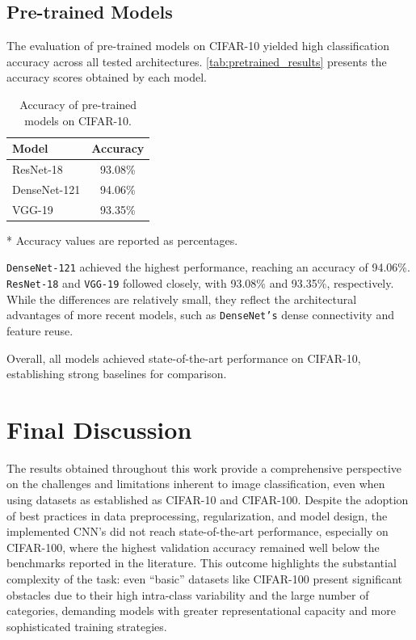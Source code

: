 \documentclass[journal,article,submit,pdftex,moreauthors]{Definitions/mdpi}
\begin{document}
\clearpage

\subsection{Pre-trained Models}
\label{sec:pretrained_models_results}

The evaluation of pre-trained models on CIFAR-10 yielded high classification accuracy across all tested architectures. \autoref{tab:pretrained_results} presents the accuracy scores obtained by each model.


\begin{table}[H]
\caption{Accuracy of pre-trained models on CIFAR-10.\label{tab:pretrained_results}}
\centering
\begin{tabular}{lc}
\toprule
\textbf{Model} & \textbf{Accuracy} \\
\midrule
ResNet-18     & 93.08\% \\
DenseNet-121  & 94.06\% \\
VGG-19        & 93.35\% \\
\bottomrule
\end{tabular}
\vspace{0.5em}

\noindent\footnotesize{* Accuracy values are reported as percentages.}
\end{table}

\texttt{DenseNet-121} achieved the highest performance, reaching an accuracy of 94.06\%. \texttt{ResNet-18} and \texttt{VGG-19} followed closely, with 93.08\% and 93.35\%, respectively. While the differences are relatively small, they reflect the architectural advantages of more recent models, such as \texttt{DenseNet’s} dense connectivity and feature reuse.

Overall, all models achieved state-of-the-art performance on CIFAR-10, establishing strong baselines for comparison.

\section{Final Discussion}
\label{sec:final_discussion}

The results obtained throughout this work provide a comprehensive perspective on the challenges and limitations inherent to image classification, even when using datasets as established as CIFAR-10 and CIFAR-100. Despite the adoption of best practices in data preprocessing, regularization, and model design, the implemented CNN's did not reach state-of-the-art performance, especially on CIFAR-100, where the highest validation accuracy remained well below the benchmarks reported in the literature. This outcome highlights the substantial complexity of the task: even “basic” datasets like CIFAR-100 present significant obstacles due to their high intra-class variability and the large number of categories, demanding models with greater representational capacity and more sophisticated training strategies.
\end{document}

